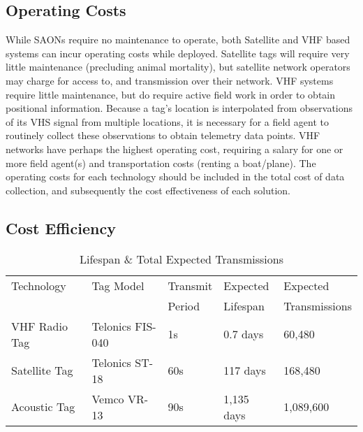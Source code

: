 \subsection{Operating Costs}
While SAONs require no maintenance to operate, both Satellite and VHF based systems can incur operating costs while deployed.  Satellite tags will require very little maintenance (precluding animal mortality), but satellite network operators may charge for access to, and transmission over their network\cite{wildlifetracking}.  VHF systems require little maintenance, but do require active field work in order to obtain positional information.  Because a tag's location is interpolated from observations of its VHS signal from multiple locations, it is necessary for a field agent to routinely collect these observations to obtain telemetry data points.  VHF networks have perhaps the highest operating cost, requiring a salary for one or more field agent(s) and transportation costs (renting a boat/plane).  The operating costs for each technology should be included in the total cost of data collection, and subsequently the cost effectiveness of each solution.
  
  


\subsection{Cost Efficiency}
\begin{table}[ht]
	\begin{tabular}{l l l l l}
		Technology&Tag Model&Transmit&Expected&Expected \\
		&& Period&Lifespan&Transmissions\\
		\hline
		VHF Radio Tag		& Telonics FIS-040	& 1s	& 0.7 days	    & 60,480\\
		Satellite Tag		& Telonics ST-18	& 60s	& 117 days		& 168,480\\
		Acoustic Tag		& Vemco VR-13		& 90s	& 1,135 days	& 1,089,600\\
	\end{tabular}
\caption{Lifespan \& Total Expected Transmissions
	\label{ExpectedLife&Tx}}
\end{table}



